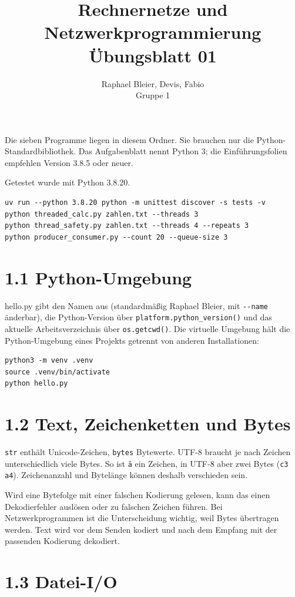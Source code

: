 \documentclass[10pt,a4paper]{article}
\title{Rechnernetze und Netzwerkprogrammierung\\Übungsblatt 01}
\author{Raphael Bleier, Devis, Fabio\\Gruppe 1}
\date{}
\begin{document}
\maketitle

Die sieben Programme liegen in diesem Ordner. Sie brauchen nur die Python-Standardbibliothek. Das Aufgabenblatt nennt Python 3; die Einführungsfolien empfehlen Version 3.8.5 oder neuer.

Getestet wurde mit Python 3.8.20.
\begin{verbatim}
uv run --python 3.8.20 python -m unittest discover -s tests -v
python threaded_calc.py zahlen.txt --threads 3
python thread_safety.py zahlen.txt --threads 4 --repeats 3
python producer_consumer.py --count 20 --queue-size 3
\end{verbatim}

\section*{1.1 Python-Umgebung}

hello.py gibt den Namen aus (standardmäßig Raphael Bleier, mit \verb|--name| änderbar), die Python-Version über \texttt{platform.python\_version()} und das aktuelle Arbeitsverzeichnis über \texttt{os.getcwd()}. Die virtuelle Umgebung hält die Python-Umgebung eines Projekts getrennt von anderen Installationen:
\begin{verbatim}
python3 -m venv .venv
source .venv/bin/activate
python hello.py
\end{verbatim}

\section*{1.2 Text, Zeichenketten und Bytes}

\verb|str| enthält Unicode-Zeichen, \verb|bytes| Bytewerte. UTF-8 braucht je nach Zeichen unterschiedlich viele Bytes. So ist \verb|ä| ein Zeichen, in UTF-8 aber zwei Bytes (\texttt{c3 a4}). Zeichenanzahl und Bytelänge können deshalb verschieden sein.

Wird eine Bytefolge mit einer falschen Kodierung gelesen, kann das einen Dekodierfehler auslösen oder zu falschen Zeichen führen. Bei Netzwerkprogrammen ist die Unterscheidung wichtig, weil Bytes übertragen werden. Text wird vor dem Senden kodiert und nach dem Empfang mit der passenden Kodierung dekodiert.

\section*{1.3 Datei-I/O}
\end{document}
